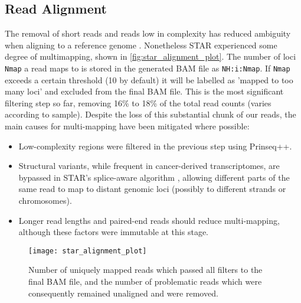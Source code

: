 \subsection{Read Alignment}
The removal of short reads and reads low in complexity has reduced ambiguity when aligning to a reference genome \citep{rhoads2015pacbio}. Nonetheless STAR experienced some degree of multimapping, shown in \autoref{fig:star_alignment_plot}. The number of loci \texttt{Nmap} a read maps to is stored in the generated BAM file as \texttt{NH:i:Nmap}. If \texttt{Nmap} exceeds a certain threshold (10 by default) it will be labelled as 'mapped to too many loci' and excluded from the final BAM file. This is the most significant filtering step so far, removing 16\% to 18\% of the total read counts (varies according to sample). Despite the loss of this substantial chunk of our reads, the main causes \citep{rhoads2015pacbio} for multi-mapping have been mitigated where possible: 
\begin{itemize}
\item[] Low-complexity regions were filtered in the previous step using Prinseq++.
\item[] Structural variants, while frequent in cancer-derived transcriptomes, are bypassed in STAR's splice-aware algorithm \citep{Dobin2013}, allowing different parts of the same read to map to distant genomic loci (possibly to different strands or chromosomes).
\item[] Longer read lengths and paired-end reads should reduce multi-mapping, although these factors were immutable at this stage.
\end{itemize}


\begin{figure}[!h]
    \centering
    \texttt{[image: star\_alignment\_plot]}
    \caption{Number of uniquely mapped reads which passed all filters to the final BAM file, and the number of problematic reads which were consequently remained unaligned and were removed.} 
    \label{fig:star_alignment_plot}
\end{figure}
\newpage


